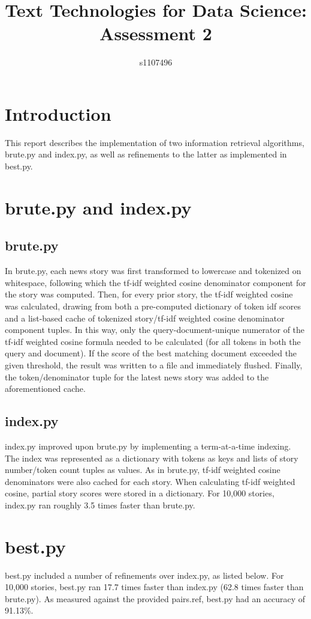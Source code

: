 \documentclass{article}
\begin{document}
\title{Text Technologies for Data Science: Assessment 2}
\author{s1107496}

\maketitle

\section{Introduction}
This report describes the implementation of two information retrieval algorithms, brute.py and index.py, as well as refinements to the latter as implemented in best.py.

\section{brute.py and index.py}
\subsection{brute.py}
In brute.py, each news story was first transformed to lowercase and tokenized on whitespace, following which the tf-idf weighted cosine denominator component for the story was computed. Then, for every prior story, the tf-idf weighted cosine was calculated, drawing from both a pre-computed dictionary of token idf scores and a list-based cache of tokenized story/tf-idf weighted cosine denominator component tuples. In this way, only the query-document-unique numerator of the tf-idf weighted cosine formula needed to be calculated (for all tokens in both the query and document).  If the score of the best matching document exceeded the given threshold, the result was written to a file and immediately flushed. Finally, the token/denominator tuple for the latest news story was added to the aforementioned cache.
\subsection{index.py}
index.py improved upon brute.py by implementing a term-at-a-time indexing. The index was represented as a dictionary with tokens as keys and lists of story number/token count tuples as values. As in brute.py, tf-idf weighted cosine denominators were also cached for each story. When calculating tf-idf weighted cosine, partial story scores were stored in a dictionary. For 10,000 stories, index.py ran roughly 3.5 times faster than brute.py.

\section{best.py}
best.py included a number of refinements over index.py, as listed below. For 10,000 stories, best.py ran 17.7 times faster than index.py (62.8 times faster than brute.py). As measured against the provided pairs.ref, best.py had an accuracy of 91.13\%.
\end{document}
